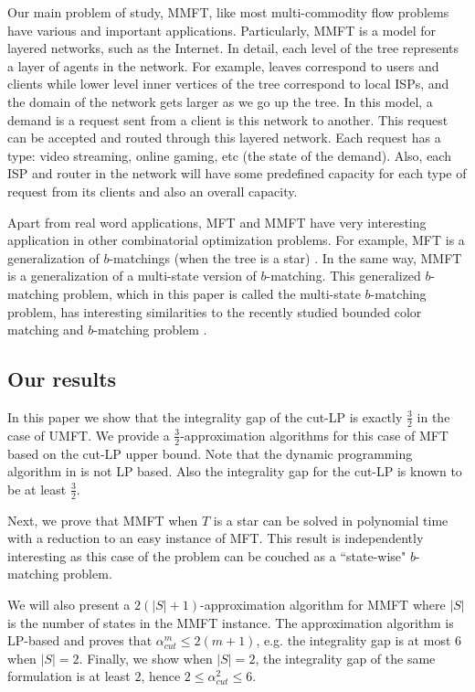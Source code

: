Our main problem of study, MMFT, like most multi-commodity flow problems have various and important applications. Particularly, MMFT is a model for layered networks, such as the Internet. In detail, each level of the tree represents a layer of agents in the network. For example, leaves correspond to users and clients while lower level inner vertices of the tree correspond to local ISPs, and the domain of the network gets larger as we go up the tree. In this model, a demand is a request sent from a client is this network to another. This request can be accepted and routed through this layered network. Each request has a type: video streaming, online gaming, etc (the state of the demand). Also, each ISP and router in the network will have some predefined capacity for each type of request from its clients and also an overall capacity. 

Apart from real word applications, MFT and MMFT have very interesting application in other combinatorial optimization problems. For example, MFT is a generalization of $b$-matchings (when the tree is a star) \cite{Chekuri}. In the same way, MMFT is a generalization of a multi-state version of $b$-matching. This generalized $b$-matching problem, which in this paper is called the multi-state $b$-matching problem, has interesting similarities to the recently studied bounded color matching and $b$-matching problem \cite{color-matching0,color-matching1, color-matching2, color-matching3}.
\subsection{Our results}

In this paper we show that the integrality gap of the cut-LP is exactly $\frac{3}{2}$ in the case of UMFT. We provide a $\frac{3}{2}$-approximation algorithms for this case of MFT based on the cut-LP upper bound. Note that the dynamic programming algorithm in \cite{Garg1997} is not LP based. Also the integrality gap for the cut-LP is known to be at least $\frac{3}{2}$. 

Next, we prove that MMFT when $T$ is a star can be solved in polynomial time with a reduction to an easy instance of MFT. This result is independently interesting as this case of the problem can be couched as a ``state-wise" $b$-matching problem.

We will also present a $2(|S|+1)$-approximation algorithm for MMFT where $|S|$ is the number of states in the MMFT instance. The approximation algorithm is LP-based and proves that $\alpha^m_{cut}\leq 2(m+1)$, e.g. the integrality gap is at most  $6$ when $|S|=2$. Finally, we show when $|S|=2$, the integrality gap of the same formulation is at least $2$, hence $2\leq \alpha^2_{cut} \leq 6$. 



